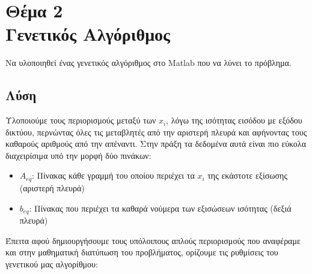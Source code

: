\documentclass[twocolumn]{report}
\begin{document}
\section*{Θέμα 2\\Γενετικός Αλγόριθμος}
Να υλοποιηθεί ένας γενετικός αλγόριθμος στο 
Matlab που να λύνει το πρόβλημα.
\subsection*{Λύση}
Υλοποιούμε τους περιορισμούς μεταξύ των $x_i$, λόγω της ισότητας εισόδου με εξόδου δικτύου,
περνώντας όλες τις μεταβλητές από την αριστερή πλευρά και αφήνοντας τους καθαρούς
αριθμούς από την απέναντι. Στην πράξη τα δεδομένα αυτά είναι πιο εύκολα διαχειρίσιμα 
υπό την μορφή δύο πινάκων:
\begin{itemize}
    \item $A_{eq}$: Πίνακας κάθε γραμμή του οποίου περιέχει τα $x_i$ της εκάστοτε 
    εξίσωσης (αριστερή πλευρά)
    \item $b_{eq}$: Πίνακας που περιέχει τα καθαρά νούμερα των εξισώσεων ισότητας 
    (δεξιά πλευρά)
\end{itemize}
Έπειτα αφού δημιουργήσουμε τους υπόλοιπους απλούς περιορισμούς που αναφέραμε και στην 
μαθηματική διατύπωση του προβλήματος, ορίζουμε τις ρυθμίσεις του γενετικού μας αλγορίθμου:
\end{document}
